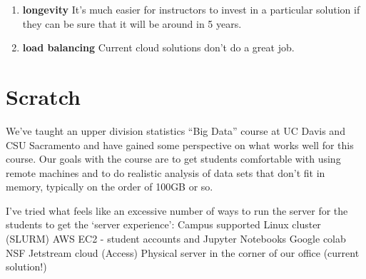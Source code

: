 \documentclass[12pt]{article}
\begin{document}
\begin{enumerate}
\item \textbf{longevity} It's much easier for instructors to invest in a particular solution if they can be sure that it will be around in 5 years.
\item \textbf{load balancing} Current cloud solutions don't do a great job.
\end{enumerate}




\section{Scratch}

We've taught an upper division statistics ``Big Data'' course at UC Davis and CSU Sacramento and have gained some perspective on what works well for this course.
Our goals with the course are to get students comfortable with using remote machines and to do realistic analysis of data sets that don’t fit in memory, typically on the order of 100GB or so.
 
I’ve tried what feels like an excessive number of ways to run the server for the students to get the `server experience':
Campus supported Linux cluster (SLURM)
AWS EC2 - student accounts and Jupyter Notebooks
Google colab
NSF Jetstream cloud (Access)
Physical server in the corner of our office (current solution!)
\end{document}
